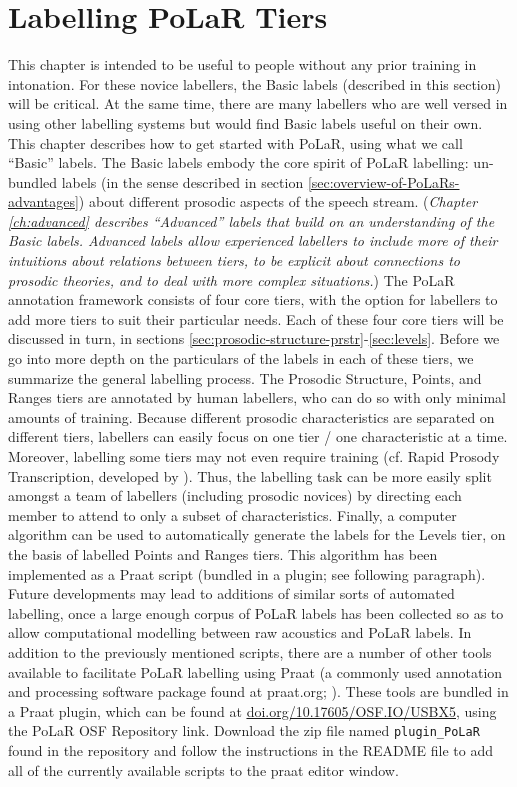 \documentclass[11pt, twoside]{memoir}
\begin{document}
\section{Labelling PoLaR Tiers}\label{sec:labelling-polar-tiers}
This chapter is intended to be useful to people without any prior training in intonation. For these novice labellers, the Basic labels (described in this section) will be critical. At the same time, there are many labellers who are well versed in using other labelling systems but would find Basic labels useful on their own. This chapter describes how to get started with PoLaR, using what we call “Basic” labels. The Basic labels embody the core spirit of PoLaR labelling: un-bundled labels (in the sense described in section \ref{sec:overview-of-PoLaRs-advantages}) about different prosodic aspects of the speech stream.
(\textit{Chapter \ref{ch:advanced} describes “Advanced” labels that build on an understanding of the Basic labels. Advanced labels allow experienced labellers to include more of their intuitions about relations between tiers, to be explicit about connections to prosodic theories, and to deal with more complex situations.})
The PoLaR annotation framework consists of four core tiers, with the option for labellers to add more tiers to suit their particular needs. Each of these four core tiers will be discussed in turn, in sections \ref{sec:prosodic-structure-prstr}-\ref{sec:levels}.
Before we go into more depth on the particulars of the labels in each of these tiers, we summarize the general labelling process. The Prosodic Structure, Points, and Ranges tiers are annotated by human labellers, who can do so with only minimal amounts of training. Because different prosodic characteristics are separated on different tiers, labellers can easily focus on one tier / one characteristic at a time. Moreover, labelling some tiers may not even require training (cf. Rapid Prosody Transcription, developed by \citealt{cole-14}). Thus, the labelling task can be more easily split amongst a team of labellers (including prosodic novices) by directing each member to attend to only a subset of characteristics. Finally, a computer algorithm can be used to automatically generate the labels for the Levels tier, on the basis of labelled Points and Ranges tiers. This algorithm has been implemented as a Praat script (bundled in a plugin; see following paragraph). Future developments may lead to additions of similar sorts of automated labelling, once a large enough corpus of PoLaR labels has been collected so as to allow computational modelling between raw acoustics and PoLaR labels.
In addition to the previously mentioned scripts, there are a number of other tools available to facilitate PoLaR labelling using Praat (a commonly used annotation and processing software package found at praat.org; \citealt{praat}). These tools are bundled in a Praat plugin, which can be found at \href{https://doi.org/10.17605/OSF.IO/USBX5}{\uline{doi.org/10.17605/OSF.IO/USBX5}}, using the PoLaR OSF Repository link. Download the zip file named \texttt{plugin\_PoLaR} found in the repository and follow the instructions in the README file to add all of the currently available scripts to the praat editor window.
\end{document}
